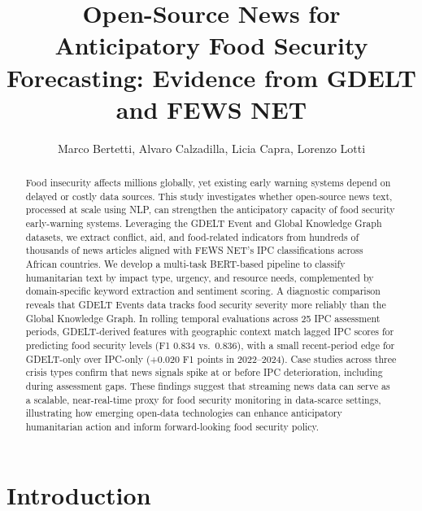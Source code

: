 \documentclass{article}
\title{Open-Source News for Anticipatory Food Security Forecasting: Evidence from GDELT and FEWS NET}
\author{Marco Bertetti, Alvaro Calzadilla, Licia Capra, Lorenzo Lotti}
\begin{document}
\date{}

\maketitle

\begin{abstract}
Food insecurity affects millions globally, yet existing early warning systems depend on delayed or costly data sources. This study investigates whether open-source news text, processed at scale using NLP, can strengthen the anticipatory capacity of food security early-warning systems. Leveraging the GDELT Event and Global Knowledge Graph datasets, we extract conflict, aid, and food-related indicators from hundreds of thousands of news articles aligned with FEWS NET's IPC classifications across African countries. We develop a multi-task BERT-based pipeline to classify humanitarian text by impact type, urgency, and resource needs, complemented by domain-specific keyword extraction and sentiment scoring. A diagnostic comparison reveals that GDELT Events data tracks food security severity more reliably than the Global Knowledge Graph. In rolling temporal evaluations across 25 IPC assessment periods, GDELT-derived features with geographic context match lagged IPC scores for predicting food security levels (F1 0.834 vs.\ 0.836), with a small recent-period edge for GDELT-only over IPC-only (+0.020 F1 points in 2022--2024). Case studies across three crisis types confirm that news signals spike at or before IPC deterioration, including during assessment gaps. These findings suggest that streaming news data can serve as a scalable, near-real-time proxy for food security monitoring in data-scarce settings, illustrating how emerging open-data technologies can enhance anticipatory humanitarian action and inform forward-looking food security policy.
\end{abstract}


\section{Introduction}
\end{document}
